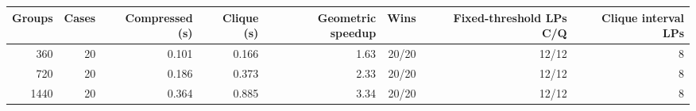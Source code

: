 \begin{tabular}{rrrrrrrr}
\toprule
Groups & Cases & Compressed (s) & Clique (s) & Geometric speedup & Wins & Fixed-threshold LPs C/Q & Clique interval LPs \\
\midrule
360 & 20 & 0.101 & 0.166 & 1.63 & 20/20 & 12/12 & 8 \\
720 & 20 & 0.186 & 0.373 & 2.33 & 20/20 & 12/12 & 8 \\
1440 & 20 & 0.364 & 0.885 & 3.34 & 20/20 & 12/12 & 8 \\
\bottomrule
\end{tabular}
